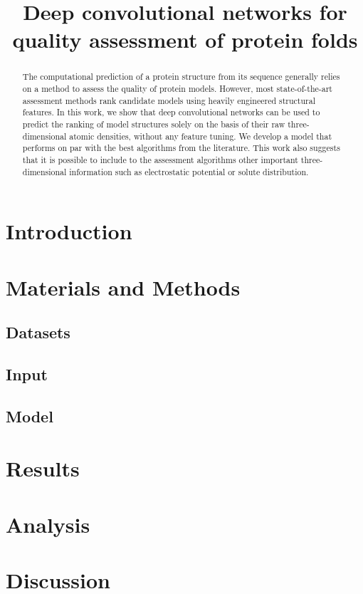 \documentclass[letter,10pt]{article}
\title{Deep convolutional networks for quality assessment of protein folds}
\author{}
\begin{document}
\maketitle

\begin{abstract}
The computational prediction of a protein structure from its sequence
generally relies on a method to assess the quality of protein
models. However, most state-of-the-art assessment methods rank
candidate models using heavily engineered structural features. In this
work, we show that deep convolutional networks can be used to predict
the ranking of model structures solely on the basis of their raw
three-dimensional atomic densities, without any feature tuning.  We
develop a model that performs on par with the best algorithms from the
literature. This work also suggests that it is possible to include to
the assessment algorithms other important three-dimensional
information such as electrostatic potential or solute distribution.
\end{abstract}

\section{Introduction}


\section{Materials and Methods}

\subsection{Datasets}


\subsection{Input}


\subsection{Model}




\section{Results}


\section{Analysis}


\section{Discussion}




\end{document}
